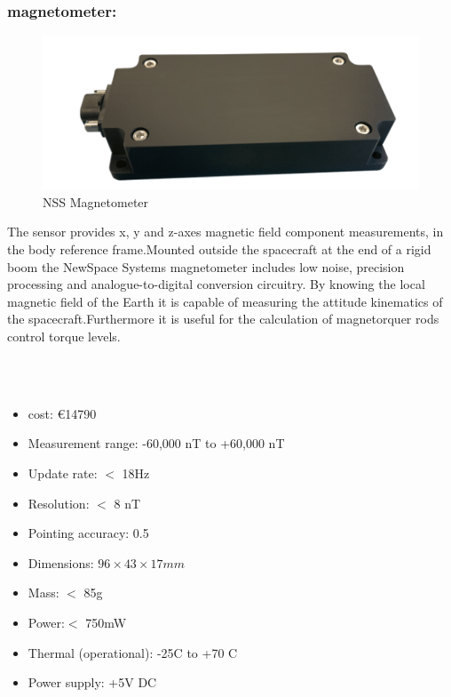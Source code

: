 \documentclass[11pt]{article}
\begin{document}
\subsubsection{magnetometer:}
\begin{minipage}{.5 \textwidth}
 \begin{figure} [H]

  \centering 

  \includegraphics[scale=0.4]{magnetometer.PNG}



  \caption{ NSS Magnetometer
  \cite{magnetometer}}
  \label{magnetometer}
  \end{figure}
\end{minipage}
 \begin{minipage}{.5 \textwidth}
 The sensor provides x, y and z-axes magnetic field component measurements, in the body reference frame.Mounted outside the spacecraft at the end of a rigid boom the NewSpace Systems magnetometer includes low noise, precision processing and analogue-to-digital conversion circuitry. By knowing the local magnetic field of the Earth it is capable of measuring the attitude kinematics of the spacecraft.Furthermore it is useful  for the calculation of magnetorquer rods control torque levels. 

 \end{minipage}\\\\

\begin{multicols}{2}
\begin{itemize}
\item cost: \euro{14790}
\item    Measurement range: -60,000 nT to +60,000 nT
\item   Update rate: $<$ 18Hz
\item   Resolution: $<$ 8 nT
\item Pointing accuracy: 0.5 \degree
\item  Dimensions: $96\times 43 \times 17mm$
\item  Mass: $<$ 85g
\item    Power:$ < $ 750mW
\item    Thermal (operational): -25\degree C to +70 \degree C
\item Power supply: +5V DC
    


\end{itemize}
\end{multicols}
\end{document}
